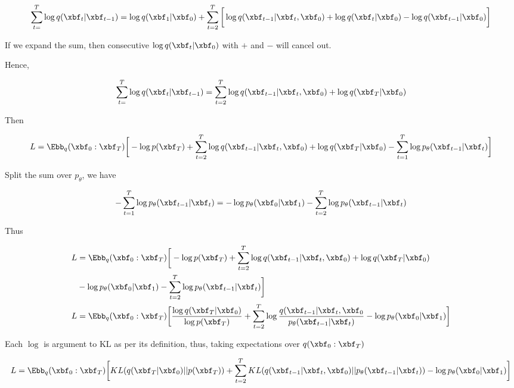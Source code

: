\documentclass[12pt, xcolor=dvipsnames,svgnames,x11names]{article}
\begin{document}
  \begin{align*}
  \sum_{t=}^T \log   q(\xbf_t|\xbf_{t-1}) = \log   q(\xbf_1|\xbf_0) + \sum_{t=2}^T \bigg[ \log q(\xbf_{t-1} | \xbf_t, \xbf_0) + \log q(\xbf_t | \xbf_0) - \log q(\xbf_{t-1} | \xbf_0) \bigg]
  \end{align*}
  
  If we expand the sum, then consecutive $\log q(\xbf_t | \xbf_0)$ with $+$ and $-$ will cancel out.
  
  Hence, 
  
  
    \begin{align*}
  \sum_{t=}^T \log   q(\xbf_t|\xbf_{t-1}) =\sum_{t=2}^T \log q(\xbf_{t-1} | \xbf_t, \xbf_0) + \log q(\xbf_T | \xbf_0)
  \end{align*}
  
  Then
  
  \begin{align*}
   L = \Ebb_q(\xbf_0:\xbf_T)\bigg [-\log p(\xbf_T) +  \sum_{t=2}^T \log q(\xbf_{t-1} | \xbf_t, \xbf_0) + \log q(\xbf_T | \xbf_0) -  \sum_{t=1}^T\log p_\theta(\xbf_{t-1}| \xbf_t)\bigg]
  \end{align*}
  
  
  Split the sum over $p_\theta$, we have
  
  \begin{align*}
  -\sum_{t=1}^T \log p_\theta(\xbf_{t-1}| \xbf_t) = -\log p_\theta(\xbf_0| \xbf_1) - \sum_{t=2}^T \log p_\theta(\xbf_{t-1}  | \xbf_t)
  \end{align*}
  
  Thus
  
  \begin{align*}
  L & = \Ebb_q(\xbf_0:\xbf_T)\bigg [-\log p(\xbf_T) +  \sum_{t=2}^T \log q(\xbf_{t-1} | \xbf_t, \xbf_0) + \log q(\xbf_T | \xbf_0) \\
  & -\log p_\theta(\xbf_0| \xbf_1) - \sum_{t=2}^T \log p_\theta(\xbf_{t-1}  | \xbf_t)\bigg]\\
  L & =  \Ebb_q(\xbf_0:\xbf_T)\bigg [\frac{ \log q(\xbf_T | \xbf_0)}{\log p(\xbf_T)} + \sum_{t=2}^T \log \frac{q(\xbf_{t-1}|\xbf_t, \xbf_0}{p_\theta(\xbf_{t-1} | \xbf_t)} - \log p_\theta(\xbf_0 | \xbf_1) \bigg]
  \end{align*}
  
  Each $\log$ is argument to KL as per its definition, thus, taking expectations over $q(\xbf_0 : \xbf_T)$
  
  \begin{align*}
  L = \Ebb_q(\xbf_0: \xbf_T) \bigg[ KL(q(\xbf_T | \xbf_0)|| p(\xbf_T)) + \sum_{t=2}^T KL(q(\xbf_{t-1} | \xbf_t, \xbf_0) || p_\theta(\xbf_{t-1} | \xbf_t)) - \log p_\theta(\xbf_0 | \xbf_1) \bigg]
  \end{align*}
  
\end{document}
